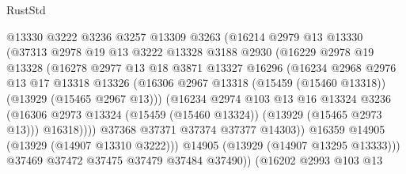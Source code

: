 \begin{lexlean}{RustStd}
\begin{coremodule}
                      @13330
                      @3222
                      @3236
                      @3257
                      @13309
                      @3263
                      (@16214
                        @2979
                        @13
                        @13330
                        (@37313
                          @2978
                          @19
                          @13
                          @3222
                          @13328
                          @3188
                          @2930
                          (@16229
                            @2978
                            @19
                            @13328
                            (@16278
                              @2977
                              @13
                              @18
                              @3871
                              @13327
                              @16296
                              (@16234
                                @2968
                                @2976
                                @13
                                @17
                                @13318
                                @13326
                                (@16306
                                  @2967
                                  @13318
                                  (@15459 (@15460 @13318))
                                  (@13929 (@15465 @2967 @13)))
                                (@16234
                                  @2974
                                  @103
                                  @13
                                  @16
                                  @13324
                                  @3236
                                  (@16306
                                    @2973
                                    @13324
                                    (@15459 (@15460 @13324))
                                    (@13929 (@15465 @2973 @13)))
                                  @16318))))
                          @37368
                          @37371
                          @37374
                          @37377
                          @14303))
                      @16359
                      @14905
                      (@13929 (@14907 @13310 @3222)))
                    @14905
                    (@13929 (@14907 @13295 @13333)))
                  @37469
                  @37472
                  @37475
                  @37479
                  @37484
                  @37490))
              (@16202
                @2993
                @103
                @13

\end{coremodule}
\end{lexlean}

